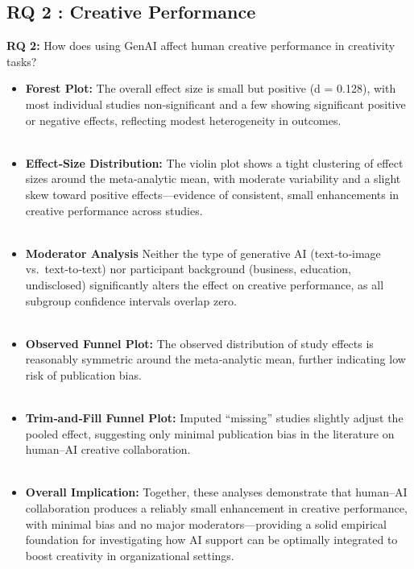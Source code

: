 \documentclass[acmsmall,authorversion]{acmart}
\begin{document}
\subsection{RQ 2 : Creative Performance}
\label{sec:CreativePerformance}
\textbf{RQ 2:} How does using GenAI affect human creative performance in creativity tasks? \\
\begin{itemize}
    \item \textbf{Forest Plot:} The overall effect size is small but positive (d = 0.128), with most individual studies non‐significant and a few showing significant positive or negative effects, reflecting modest heterogeneity in outcomes.
    \\ \\
    \item \textbf{Effect‐Size Distribution:} The violin plot shows a tight clustering of effect sizes around the meta‐analytic mean, with moderate variability and a slight skew toward positive effects—evidence of consistent, small enhancements in creative performance across studies.
    \\ \\
    \item \textbf{Moderator Analysis} Neither the type of generative AI (text‐to‐image vs.\ text‐to‐text) nor participant background (business, education, undisclosed) significantly alters the effect on creative performance, as all subgroup confidence intervals overlap zero.
    \\ \\
    \item \textbf{Observed Funnel Plot:} The observed distribution of study effects is reasonably symmetric around the meta‐analytic mean, further indicating low risk of publication bias.
    \\ \\
    \item \textbf{Trim‐and‐Fill Funnel Plot:} Imputed “missing” studies slightly adjust the pooled effect, suggesting only minimal publication bias in the literature on human–AI creative collaboration.
    \\ \\
    \item \textbf{Overall Implication:} Together, these analyses demonstrate that human–AI collaboration produces a reliably small enhancement in creative performance, with minimal bias and no major moderators—providing a solid empirical foundation for investigating how AI support can be optimally integrated to boost creativity in organizational settings.
\end{itemize}
\end{document}
